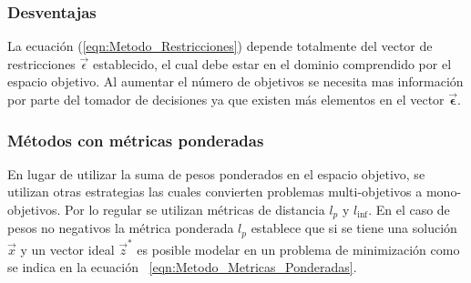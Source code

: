\subsubsection*{Desventajas}
La ecuación (\ref{eqn:Metodo_Restricciones}) depende totalmente del vector de restricciones $\vec{\epsilon}$ establecido, el cual debe estar en el dominio comprendido por el espacio objetivo. Al aumentar el número de objetivos se necesita mas información por parte del tomador de decisiones ya que existen más elementos en el vector $\vec{\mathbf{\epsilon}}$.
\subsubsection{Métodos con métricas ponderadas}
En lugar de utilizar la suma de pesos ponderados en el espacio objetivo, se utilizan otras estrategias las cuales convierten problemas multi-objetivos a mono-objetivos.
%
Por lo regular se utilizan métricas de distancia $l_p$ y $l_{\inf}$. 
%
En el caso de pesos no negativos la métrica ponderada $l_p$ establece que si se tiene una solución $\vec{x}$ y un vector ideal $\vec{z}^*$ es posible modelar en un problema de minimización como se indica en la ecuación ~\ref{eqn:Metodo_Metricas_Ponderadas}.

